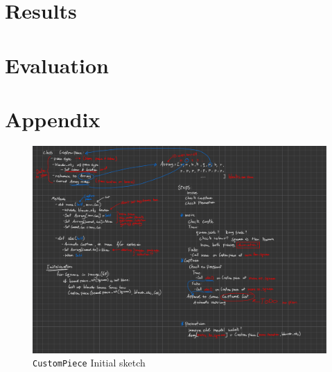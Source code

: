 \documentclass[11pt]{article}
\begin{document}
\section{Results}
\label{sec:orgf5a4f6c}
\section{Evaluation}
\label{sec:org431321f}

\newpage
\section{Appendix}
\label{sec:org72b8651}
\begin{figure}[htbp]
\centering
\includegraphics[width=\textwidth]{Scratchpad.pdf}
\caption{\label{class-sketch}\texttt{CustomPiece} Initial sketch}
\end{figure}
\end{document}
